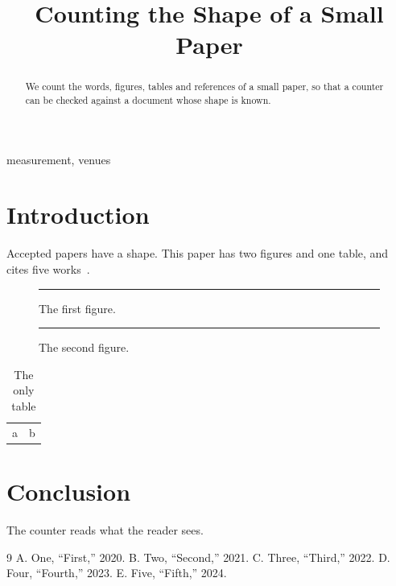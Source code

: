 \documentclass[10pt,conference]{IEEEtran}
\begin{document}
\title{Counting the Shape of a Small Paper}
\author{}
\maketitle
\begin{abstract}
We count the words, figures, tables and references of a small paper, so that a counter can be
checked against a document whose shape is known.
\end{abstract}
\begin{IEEEkeywords}
measurement, venues
\end{IEEEkeywords}
\section{Introduction}
Accepted papers have a shape. This paper has two figures and one table, and cites five
works~\cite{a,b,c,d,e}.
\begin{figure}[h]\centering\rule{2cm}{1cm}\caption{The first figure.}\end{figure}
\begin{figure}[h]\centering\rule{2cm}{1cm}\caption{The second figure.}\end{figure}
\begin{table}[h]\centering\caption{The only table}\begin{tabular}{ll}a & b\\\end{tabular}\end{table}
\section{Conclusion}
The counter reads what the reader sees.
\begin{thebibliography}{9}
 A. One, ``First,'' 2020.
 B. Two, ``Second,'' 2021.
 C. Three, ``Third,'' 2022.
 D. Four, ``Fourth,'' 2023.
 E. Five, ``Fifth,'' 2024.
\end{thebibliography}
\end{document}
